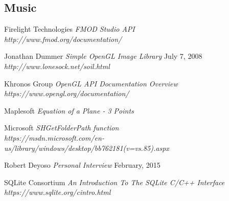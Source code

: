 \documentclass{article}
\begin{document}
\subsection{Music}

\pagebreak

\begin{thebibliography}{9}

Firelight Technologies 
\textit{FMOD Studio API} \\
\textit{http://www.fmod.org/documentation/}

Jonathan Dummer
\textit{Simple OpenGL Image Library} July 7, 2008 \\
\textit{http://www.lonesock.net/soil.html}
	
Khronos Group
\textit{OpenGL API Documentation Overview} \\
\textit{https://www.opengl.org/documentation/}

Maplesoft
\textit{Equation of a Plane - 3 Points}

Microsoft
\textit{SHGetFolderPath function} \\
\textit{https://msdn.microsoft.com/en-us/library/windows/desktop/bb762181(v=vs.85).aspx}

Robert Deyoso
\textit{Personal Interview} February, 2015

SQLite Consortium
\textit{An Introduction To The SQLite C/C++ Interface} \\
\textit{https://www.sqlite.org/cintro.html}

\end{thebibliography}
\end{document}

